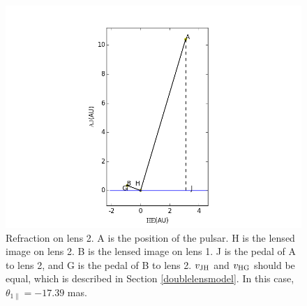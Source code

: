 \documentclass[useAMS,usenatbib]{mn2e}
\begin{document}
\begin{figure}
\centering
\includegraphics[width=1.0\linewidth,scale=1.0]{First_reflection.png}
\caption{Refraction on lens 2. 
A is the position of the pulsar. H is the lensed image on lens 2. B is the lensed image on lens 1. J is the pedal of A to lens 2, and G is the pedal of B to lens 2. $v_{\rm JH}$ and $v_{\rm HG}$ should be equal, which is described in Section \ref{doublelensmodel}. In this case, $\theta_{1\parallel} =-17.39$ mas.}
\label{first_reflect}
\end{figure}
\end{document}
